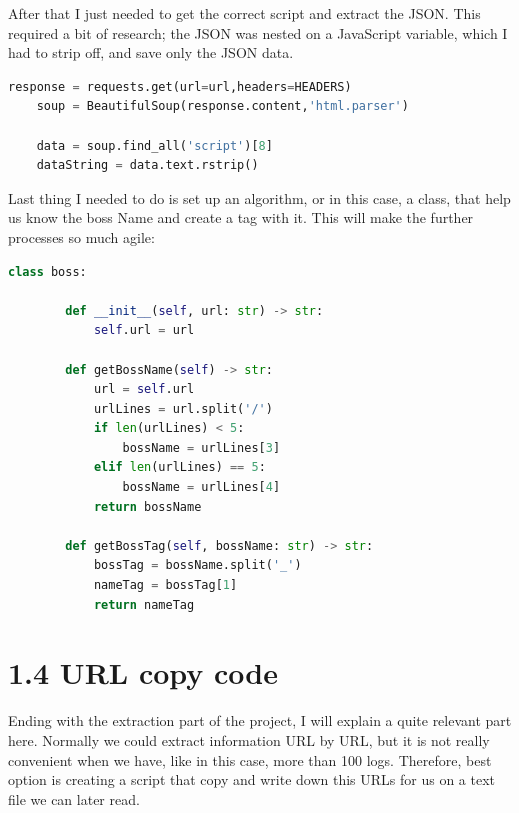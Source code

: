 \documentclass[12pt,a4paper]{article}
\begin{document}
    \noindent After that I just needed to get the correct script and extract the JSON. This required a bit of 
    research; the JSON was nested on a JavaScript variable, which I had to strip off, and save only the
    JSON data.

    \begin{lstlisting}[language=Python]
    response = requests.get(url=url,headers=HEADERS)
    soup = BeautifulSoup(response.content,'html.parser')

    data = soup.find_all('script')[8]
    dataString = data.text.rstrip()
    \end{lstlisting}

    \newpage

    Last thing I needed to do is set up an algorithm, or in this case, a class, that help us know
    the boss Name and create a tag with it. This will make the further processes so much agile:

    \begin{lstlisting}[language=Python]
    class boss:

        def __init__(self, url: str) -> str:
            self.url = url

        def getBossName(self) -> str:
            url = self.url
            urlLines = url.split('/')
            if len(urlLines) < 5:
                bossName = urlLines[3]
            elif len(urlLines) == 5:
                bossName = urlLines[4]
            return bossName
        
        def getBossTag(self, bossName: str) -> str:
            bossTag = bossName.split('_')
            nameTag = bossTag[1]
            return nameTag
    \end{lstlisting}

    \section*{\large 1.4 URL copy code}
    Ending with the extraction part of the project, I will explain a quite relevant part here. 
    Normally we could extract information URL by URL, but it is not really convenient when we have, 
    like in this case, more than 100 logs. Therefore, best option is creating a script that copy and 
    write down this URLs for us on a text file we can later read.\\
\end{document}
